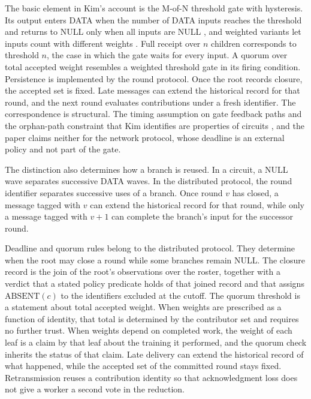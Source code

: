 \documentclass[11pt]{article}
\theoremstyle{definition}
\theoremstyle{remark}
\begin{document}
The basic element in Kim's account is the M-of-N threshold gate with hysteresis. Its output enters DATA when the number of DATA inputs reaches the threshold and returns to NULL only when all inputs are NULL \cite[Sec.~2.2, p.~22]{kim2020}, and weighted variants let inputs count with different weights \cite[Sec.~2.2, p.~25]{kim2020}. Full receipt over $n$ children corresponds to threshold $n$, the case in which the gate waits for every input. A quorum over total accepted weight resembles a weighted threshold gate in its firing condition. Persistence is implemented by the round protocol. Once the root records closure, the accepted set is fixed. Late messages can extend the historical record for that round, and the next round evaluates contributions under a fresh identifier. The correspondence is structural. The timing assumption on gate feedback paths and the orphan-path constraint that Kim identifies are properties of circuits \cite[Sec.~2.1, p.~12]{kim2020}, and the paper claims neither for the network protocol, whose deadline is an external policy and not part of the gate.

The distinction also determines how a branch is reused. In a circuit, a NULL wave separates successive DATA waves. In the distributed protocol, the round identifier separates successive uses of a branch. Once round $v$ has closed, a message tagged with $v$ can extend the historical record for that round, while only a message tagged with $v+1$ can complete the branch's input for the successor round.

Deadline and quorum rules belong to the distributed protocol. They determine when the root may close a round while some branches remain NULL. The closure record is the join of the root's observations over the roster, together with a verdict that a stated policy predicate holds of that joined record and that assigns $\mathrm{ABSENT}(c)$ to the identifiers excluded at the cutoff. The quorum threshold is a statement about total accepted weight. When weights are prescribed as a function of identity, that total is determined by the contributor set and requires no further trust. When weights depend on completed work, the weight of each leaf is a claim by that leaf about the training it performed, and the quorum check inherits the status of that claim. Late delivery can extend the historical record of what happened, while the accepted set of the committed round stays fixed. Retransmission reuses a contribution identity so that acknowledgment loss does not give a worker a second vote in the reduction.
\end{document}
